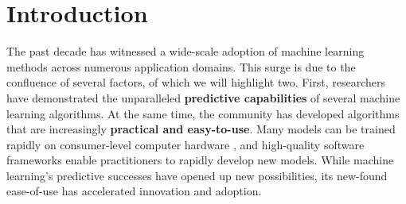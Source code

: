 \chapter{Introduction}
\label{chapter:introduction}









The past decade has witnessed a wide-scale adoption of machine learning methods across numerous application domains.
This surge is due to the confluence of several factors, of which we will highlight two.
First, researchers have demonstrated the unparalleled {\bf predictive capabilities} of several machine learning algorithms.
At the same time, the community has developed algorithms that are increasingly {\bf practical and easy-to-use}.
Many models can be trained rapidly on consumer-level computer hardware \cite{howard2018training}, and high-quality software frameworks enable practitioners to rapidly develop new models.
While machine learning's predictive successes have opened up new possibilities, its new-found ease-of-use has accelerated innovation and adoption.

